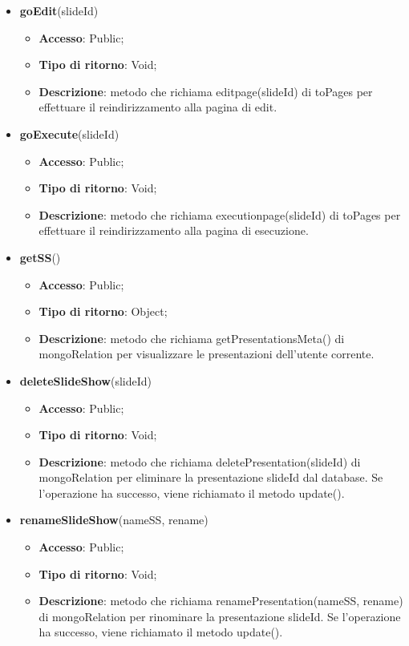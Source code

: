 {{\begin{itemize}
			\item \textbf{goEdit}(slideId)
			\begin{itemize}
				\item \textbf{Accesso}: Public;
				\item \textbf{Tipo di ritorno}: Void;
				\item \textbf{Descrizione}: metodo che richiama editpage(slideId) di toPages per effettuare il reindirizzamento alla pagina di edit.
			\end{itemize}
			\item \textbf{goExecute}(slideId)
			\begin{itemize}
				\item \textbf{Accesso}: Public;
				\item \textbf{Tipo di ritorno}: Void;
				\item \textbf{Descrizione}: metodo che richiama executionpage(slideId) di toPages per effettuare il reindirizzamento alla pagina di esecuzione.
			\end{itemize}
			\item \textbf{getSS}()
			\begin{itemize}
				\item \textbf{Accesso}: Public;
				\item \textbf{Tipo di ritorno}: Object;
				\item \textbf{Descrizione}: metodo che richiama getPresentationsMeta() di mongoRelation per visualizzare le presentazioni dell'utente corrente.
			\end{itemize}
			\item \textbf{deleteSlideShow}(slideId)
			\begin{itemize}
				\item \textbf{Accesso}: Public;
				\item \textbf{Tipo di ritorno}: Void;
				\item \textbf{Descrizione}: metodo che richiama deletePresentation(slideId) di mongoRelation per eliminare la presentazione slideId dal database. Se l'operazione ha successo, viene richiamato il metodo update().
			\end{itemize}
			\item \textbf{renameSlideShow}(nameSS, rename)
			\begin{itemize}
				\item \textbf{Accesso}: Public;
				\item \textbf{Tipo di ritorno}: Void;
				\item \textbf{Descrizione}: metodo che richiama renamePresentation(nameSS, rename) di mongoRelation per rinominare la presentazione slideId. Se l'operazione ha successo, viene richiamato il metodo update().

\end{itemize}
\end{itemize}}}
